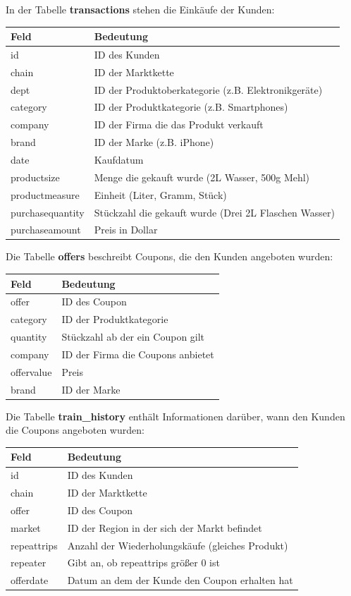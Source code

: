In der Tabelle \textbf{transactions} stehen die Einkäufe der Kunden:\\
\begin{tabular}{|l|l|}
	\hline \textbf{Feld} & \textbf{Bedeutung}  \\ 
	\hline id & ID des Kunden \\ 
	\hline chain & ID der Marktkette \\ 
	\hline dept  & ID der Produktoberkategorie (z.B. Elektronikgeräte)  \\ 
	\hline category & ID der Produktkategorie (z.B. Smartphones) \\ 
	\hline company & ID der Firma die das Produkt verkauft \\ 
	\hline brand & ID der Marke (z.B. iPhone) \\ 
	\hline date & Kaufdatum \\
	\hline productsize & Menge die gekauft wurde (2L Wasser, 500g Mehl) \\ 	
	\hline productmeasure & Einheit (Liter, Gramm, Stück) \\ 	
	\hline purchasequantity & Stückzahl die gekauft wurde (Drei 2L Flaschen Wasser) \\ 
	\hline purchaseamount & Preis in Dollar \\ 
	\hline 
\end{tabular}

Die Tabelle \textbf{offers} beschreibt Coupons, die den Kunden angeboten wurden:\\
\begin{tabular}{|l|l|}
	\hline \textbf{Feld} & \textbf{Bedeutung}  \\ 
	\hline offer & ID des Coupon \\ 
	\hline category & ID der Produktkategorie \\ 
	\hline quantity & Stückzahl ab der ein Coupon gilt \\ 
	\hline company & ID der Firma die Coupons anbietet \\ 
	\hline offervalue & Preis \\ 
	\hline brand & ID der Marke \\ 
	\hline 
\end{tabular}

Die Tabelle \textbf{train\_history} enthält Informationen darüber, wann den Kunden die Coupons angeboten wurden: \\
\begin{tabular}{|l|l|}
	\hline \textbf{Feld} & \textbf{Bedeutung}  \\ 
	\hline id & ID des Kunden \\ 
	\hline chain & ID der Marktkette \\ 
	\hline offer  & ID des Coupon  \\ 
	\hline market & ID der Region in der sich der Markt befindet  \\ 
	\hline repeattrips & Anzahl der Wiederholungskäufe (gleiches Produkt)  \\ 
	\hline repeater & Gibt an, ob repeattrips größer 0 ist \\ 
	\hline offerdate & Datum an dem der Kunde den Coupon erhalten hat \\ 
	\hline 
\end{tabular} 

